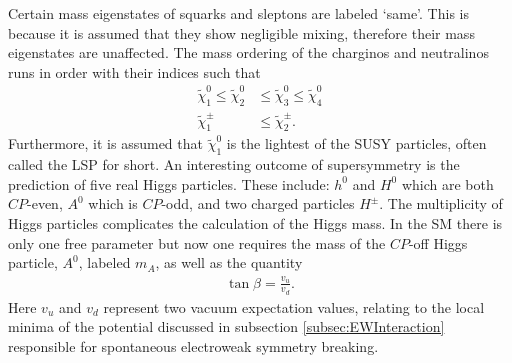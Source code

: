 \noindent Certain mass eigenstates of squarks and sleptons are labeled `same'.
This is because it is assumed that they show negligible mixing, therefore their mass eigenstates are unaffected.
The mass ordering of the charginos and neutralinos runs in order with their indices such that
\begin{align}
\tilde{\chi}^{0}_{1} \leq \tilde{\chi}^{0}_{2} &\leq \tilde{\chi}^{0}_{3} \leq \tilde{\chi}^{0}_{4} \\
\tilde{\chi}^{\pm}_{1} &\leq \tilde{\chi}^{\pm}_{2}.
\end{align}
Furthermore, it is assumed that $\tilde{\chi}^{0}_{1}$ is the lightest of the SUSY particles, often called the LSP for short.
An interesting outcome of supersymmetry is the prediction of five real Higgs particles.
These include: $h^{0}$ and $H^{0}$ which are both $CP$-even, $A^{0}$ which is $CP$-odd, and two charged particles $H^{\pm}$.
The multiplicity of Higgs particles complicates the calculation of the Higgs mass. 
In the SM there is only one free parameter but now one requires the mass of the $CP$-off Higgs particle, $A^{0}$, labeled $m_{A}$, as well as the quantity
\begin{align}
\tan \beta = \frac{v_{u}}{v_{d}}.
\label{eqn:HiggsParameter}
\end{align}
Here $v_{u}$ and $v_{d}$ represent two vacuum expectation values, relating to the local minima of the potential discussed in subsection \ref{subsec:EWInteraction} responsible for spontaneous electroweak symmetry breaking.

